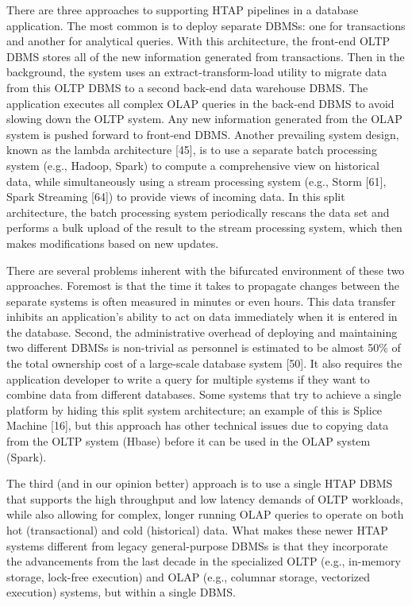 \documentclass[a4paper,11pt,twoside,openright]{article}
\begin{document}
There are three approaches to supporting HTAP pipelines in a database
application. The most common is to deploy separate DBMSs: one for
transactions and another for analytical queries. With this architecture,
the front-end OLTP DBMS stores all of the new information generated from
transactions. Then in the background, the system uses an
extract-transform-load utility to migrate data from this OLTP DBMS to a
second back-end data warehouse DBMS. The application executes all
complex OLAP queries in the back-end DBMS to avoid slowing down the OLTP
system. Any new information generated from the OLAP system is pushed
forward to front-end DBMS. Another prevailing system design, known as
the lambda architecture {[}45{]}, is to use a separate batch processing
system (e.g., Hadoop, Spark) to compute a comprehensive view on
historical data, while simultaneously using a stream processing system
(e.g., Storm {[}61{]}, Spark Streaming {[}64{]}) to provide views of
incoming data. In this split architecture, the batch processing system
periodically rescans the data set and performs a bulk upload of the
result to the stream processing system, which then makes modifications
based on new updates.

There are several problems inherent with the bifurcated environment of
these two approaches. Foremost is that the time it takes to propagate
changes between the separate systems is often measured in minutes or
even hours. This data transfer inhibits an application's ability to act
on data immediately when it is entered in the database. Second, the
administrative overhead of deploying and maintaining two different DBMSs
is non-trivial as personnel is estimated to be almost 50\% of the total
ownership cost of a large-scale database system {[}50{]}. It also
requires the application developer to write a query for multiple systems
if they want to combine data from different databases. Some systems that
try to achieve a single platform by hiding this split system
architecture; an example of this is Splice Machine {[}16{]}, but this
approach has other technical issues due to copying data from the OLTP
system (Hbase) before it can be used in the OLAP system (Spark).

The third (and in our opinion better) approach is to use a single HTAP
DBMS that supports the high throughput and low latency demands of OLTP
workloads, while also allowing for complex, longer running OLAP queries
to operate on both hot (transactional) and cold (historical) data. What
makes these newer HTAP systems different from legacy general-purpose
DBMSs is that they incorporate the advancements from the last decade in
the specialized OLTP (e.g., in-memory storage, lock-free execution) and
OLAP (e.g., columnar storage, vectorized execution) systems, but within
a single DBMS.
\end{document}
